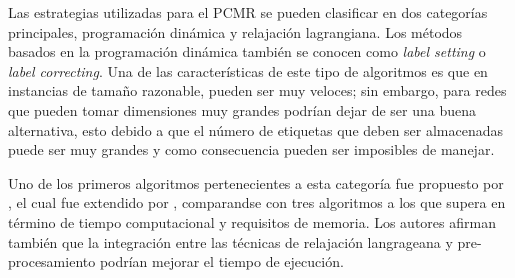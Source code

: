 


Las estrategias utilizadas para el PCMR se pueden clasificar en dos categorías principales, programación dinámica y relajación lagrangiana. Los métodos basados en la programación dinámica también se conocen como \textit{label setting} o \textit{label correcting}. Una de las características de este tipo de algoritmos es que en instancias de tamaño razonable, pueden ser muy veloces; sin embargo, para redes que pueden tomar dimensiones muy grandes podrían dejar de ser una buena alternativa, esto debido a que el número de etiquetas que deben ser almacenadas  puede ser muy grandes y como consecuencia pueden ser imposibles de manejar.

Uno de los primeros algoritmos pertenecientes a esta categoría fue propuesto por \cite{joksch1966shortest}, el cual fue extendido por \cite{dumitrescu2003improved}, comparandse con tres algoritmos \cite{dumitrescu2001algorithms,hassin1992approximation,lorenz2001simple} a los que supera en término de tiempo computacional y requisitos de memoria. Los autores afirman también que la integración entre las técnicas de relajación langrageana y pre-procesamiento podrían mejorar el tiempo de ejecución.

